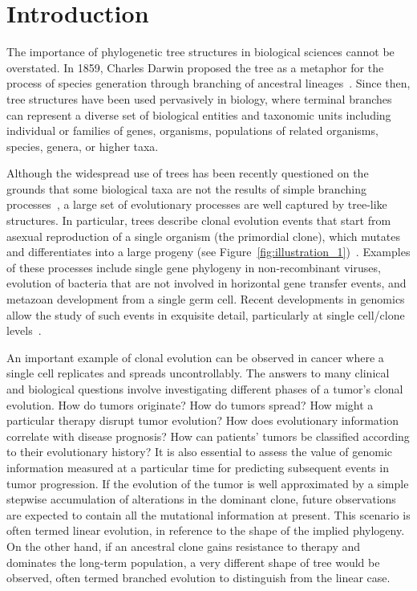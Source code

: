 \documentclass[a4paper,11pt]{article}
\begin{document}

\section{Introduction}

The importance of phylogenetic tree structures in biological sciences cannot be overstated.
In 1859, Charles Darwin proposed the tree as a metaphor for the process of species generation through branching of ancestral lineages~\cite{darwin1859origin}.
Since then, tree structures have been used pervasively in biology, where terminal branches can represent a diverse set of biological entities and taxonomic units including individual or families of genes, organisms, populations of related organisms, species, genera, or higher taxa.

Although the widespread use of trees has been recently questioned on the grounds that some biological taxa are not the results of simple branching processes~\cite{doolittle1999phylogenetic, chan2013topology}, a large set of evolutionary processes are well captured by tree-like structures.
In particular, trees describe clonal evolution events that start from asexual reproduction of a single organism (the primordial clone), which mutates and differentiates into a large progeny (see Figure~\ref{fig:illustration_1})~\cite{khiabanian2014viral}.
Examples of these processes include single gene phylogeny in non-recombinant viruses, evolution of bacteria that are not involved in horizontal gene transfer events, and metazoan development from a single germ cell.
Recent developments in genomics allow the study of such events in exquisite detail, particularly at single cell/clone levels~\cite{navin2011tumour, shalek2013single, eirew2014dynamics}.

An important example of clonal evolution can be observed in cancer where a single cell replicates and spreads uncontrollably.
The answers to many clinical and biological questions involve investigating different phases of a tumor's clonal evolution.
How do tumors originate?
How do tumors spread?
How might a particular therapy disrupt tumor evolution?
How does evolutionary information correlate with disease prognosis?
How can patients' tumors be classified according to their evolutionary history?
It is also essential to assess the value of genomic information measured at a particular time for predicting subsequent events in tumor progression.
If the evolution of the tumor is well approximated by a simple stepwise accumulation of alterations in the dominant clone, future observations are expected to contain all the mutational information at present.
This scenario is often termed linear evolution, in reference to the shape of the implied phylogeny.
On the other hand, if an ancestral clone gains resistance to therapy and dominates the long-term population, a very different shape of tree would be observed, often termed branched evolution to distinguish from the linear case.
\end{document}
